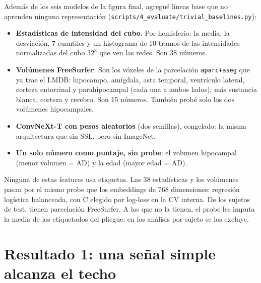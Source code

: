 \documentclass[11pt,a4paper]{article}
\begin{document}
Además de los seis modelos de la figura final, agregué líneas base que no aprenden
ninguna representación (\texttt{scripts/4\_evaluate/trivial\_baselines.py}):
\begin{itemize}
  \item \textbf{Estadísticas de intensidad del cubo}. Por hemisferio: la media, la
        desviación, 7 cuantiles y un histograma de 10 tramos de las intensidades
        normalizadas del cubo $32^3$ que ven las redes. Son 38 números.
  \item \textbf{Volúmenes FreeSurfer}. Son los vóxeles de la parcelación
        \texttt{aparc+aseg} que ya trae el LMDB: hipocampo, amígdala, asta temporal,
        ventrículo lateral, corteza entorrinal y parahipocampal (cada una a ambos lados),
        más sustancia blanca, corteza y cerebro. Son 15 números. También probé solo los
        dos volúmenes hipocampales.
  \item \textbf{ConvNeXt-T con pesos aleatorios} (dos semillas), congelado: la misma
        arquitectura que sin SSL, pero sin ImageNet.
  \item \textbf{Un solo número como puntaje, sin probe}: el volumen hipocampal (menor
        volumen = AD) y la edad (mayor edad = AD).
\end{itemize}

Ninguna de estas features usa etiquetas. Las 38 estadísticas y los volúmenes pasan por
el mismo probe que los embeddings de 768 dimensiones: regresión logística balanceada,
con C elegido por log-loss en la CV interna. De los \nnPooled{} sujetos de test, \nnVol{}
tienen parcelación FreeSurfer. A los que no la tienen, el probe les imputa la media de
los etiquetados del pliegue; en los análisis por sujeto se los excluye.

\section{Resultado 1: una señal simple alcanza el techo}
\label{sec:escalera}

\begin{table}[H]
\centering\footnotesize
\setlength{\tabcolsep}{4pt}

\caption{Media de los 5 pliegues externos.
\emph{CV}: CV representativa (23\,\% AD, edades reales).
\emph{CV emp.}: la misma CV restringida a los sujetos etiquetados, que están emparejados
por edad; ahí la edad sola da \nageMatched.
\emph{Compuesto}: $(\text{AUROC}+\text{AUPR}+\text{F1-macro})/3$.
\emph{AUROC $\pm$3 años}: AUROC sobre los pares AD-HC cuya edad difiere en 3 años o menos.
Los puntajes sin probe no tienen umbral, así que tampoco tienen F1 ni compuesto.}
\label{tab:resumen}
\end{table}
\end{document}
